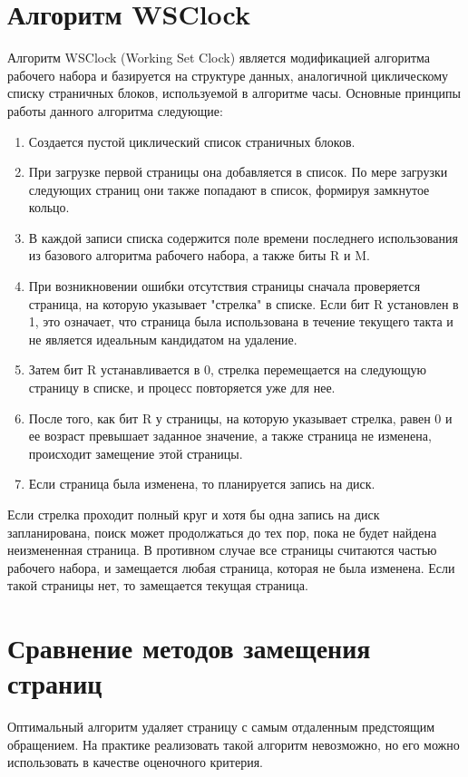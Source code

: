 \section{Алгоритм WSClock}

Алгоритм WSClock (Working Set Clock) является модификацией алгоритма рабочего набора и базируется на структуре данных, аналогичной
циклическому списку страничных блоков, используемой в алгоритме часы.
Основные принципы работы данного алгоритма следующие:
\begin{enumerate}
	\item Создается пустой циклический список страничных блоков.
	\item При загрузке первой страницы она добавляется в список. По мере загрузки следующих страниц они также попадают в список, формируя замкнутое кольцо.
	\item В каждой записи списка содержится поле времени последнего использования из базового алгоритма рабочего набора, а также биты R и
	M.
	\item При возникновении ошибки отсутствия страницы сначала проверяется
	страница, на которую указывает "стрелка" в списке. Если бит R установлен в 1, это означает, что страница была использована в течение	текущего такта и не является идеальным кандидатом на удаление.
	\item Затем бит R устанавливается в 0, стрелка перемещается на следующую
	страницу в списке, и процесс повторяется уже для нее.
	\item После того, как бит R у страницы, на которую указывает стрелка,
	равен 0 и ее возраст превышает заданное значение, а также страница не
	изменена, происходит замещение этой страницы.
	\item Если страница была изменена, то планируется запись на диск.
\end{enumerate}

Если стрелка проходит полный круг и хотя бы одна запись на диск
запланирована, поиск может продолжаться до тех пор, пока не будет найдена неизмененная страница. В противном случае все страницы считаются частью
рабочего набора, и замещается любая страница, которая не была изменена.
Если такой страницы нет, то замещается текущая страница.

\section{Сравнение методов замещения страниц}

Оптимальный алгоритм удаляет страницу с самым отдаленным предстоящим обращением. На практике реализовать такой алгоритм невозможно, но его можно использовать в качестве оценочного критерия.

